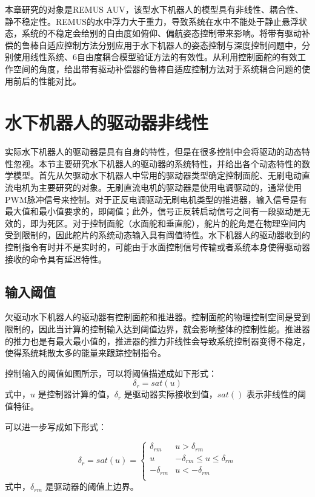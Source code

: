 本章研究的对象是REMUS AUV，该型水下机器人的模型具有非线性、耦合性、静不稳定性。REMUS的水中浮力大于重力，导致系统在水中不能处于静止悬浮状态，系统的不稳定会给别的自由度如俯仰、偏航姿态控制带来影响。将带有驱动补偿的鲁棒自适应控制方法分别应用于水下机器人的姿态控制与深度控制问题中，分别使用线性系统、6自由度耦合模型验证方法的有效性。从利用控制面舵的有效工作空间的角度，给出带有驱动补偿器的鲁棒自适应控制方法对于系统耦合问题的使用前后的性能对比。




\section{水下机器人的驱动器非线性 }

实际水下机器人的驱动器是具有自身的特性，但是在很多控制中会将驱动的动态特性忽视。本节主要研究水下机器人的驱动器的系统特性，并给出各个动态特性的数学模型。首先从欠驱动水下机器人中常用的驱动器类型确定控制面舵、无刷电动直流电机为主要研究的对象。无刷直流电机的驱动器是使用电调驱动的，通常使用PWM脉冲信号来控制。对于正反电调驱动无刷电机类型的推进器，输入信号是有最大值和最小值要求的，即阈值；此外，信号正反转启动信号之间有一段驱动是无效的，即为死区。对于控制面舵（水面舵和垂直舵），舵片的舵角是在物理空间内受到限制的，因此舵片的系统动态输入具有阈值特性。水下机器人的驱动器收到的控制指令有时并不是实时的，可能由于水面控制信号传输或者系统本身使得驱动器接收的命令具有延迟特性。

\subsection{输入阈值 }

欠驱动水下机器人的驱动器有控制面舵和推进器。控制面舵的物理控制空间是受到限制的，因此当计算的控制输入达到阈值边界，就会影响整体的控制性能。推进器的推力也是有最大最小值的，推进器的推力非线性会导致系统控制器变得不稳定，使得系统耗散太多的能量来跟踪控制指令。

控制输入的阈值如图所示，可以将阈值描述成如下形式：
\begin{equation}
\label{eq:chap6:sat}
\delta_r=sat(u)
\end{equation}
式中，$u$ 是控制器计算的值，$\delta_r$ 是驱动器实际接收到值，$sat()$ 表示非线性的阈值特征。

可以进一步写成如下形式：

\begin{equation}
\label{eq:chap6:sat}
\delta_r=sat(u)=
\left\{
\begin{matrix}
  \delta_{rm} & u > \delta_{rm}\\
   u & -\delta_{rm} \leq u \leq \delta_{rm}\\
   -\delta_{rm} & u < -\delta_{rm} \\
\end{matrix}\right.
\end{equation}
式中，$\delta_{rm}$ 是驱动器的阈值上边界。

